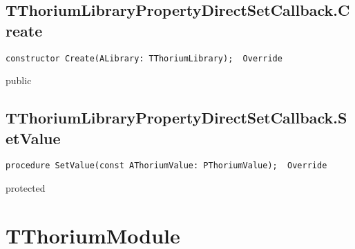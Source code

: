 \subsection{TThoriumLibraryPropertyDirectSetCallback.Create}
\label{thoriumcore:thorium:tthoriumlibrarypropertydirectsetcallback:create}
\begin{FPCList}
\Synopsis
\Declaration 

\begin{verbatim}
constructor Create(ALibrary: TThoriumLibrary);  Override
\end{verbatim}
\Visibility
public
\Description
\Errors
\end{FPCList}
\subsection{TThoriumLibraryPropertyDirectSetCallback.SetValue}
\label{thoriumcore:thorium:tthoriumlibrarypropertydirectsetcallback:setvalue}
\begin{FPCList}
\Synopsis
\Declaration 

\begin{verbatim}
procedure SetValue(const AThoriumValue: PThoriumValue);  Override
\end{verbatim}
\Visibility
protected
\Description
\Errors
\end{FPCList}
\section{TThoriumModule}
\label{thoriumcore:thorium:tthoriummodule}
